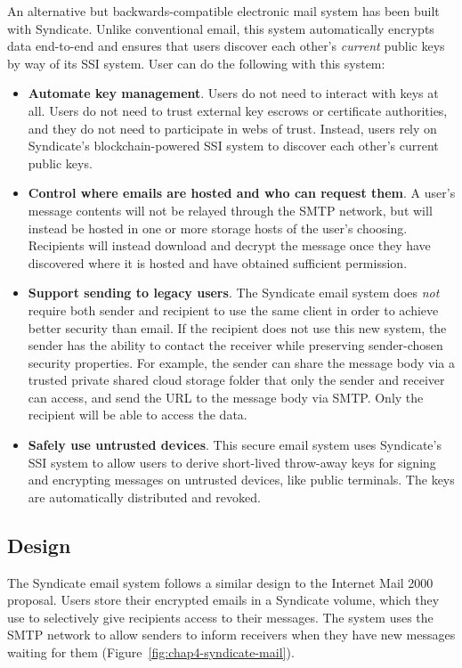 An alternative but backwards-compatible electronic mail system has been built
with Syndicate.  Unlike conventional email, this system
automatically encrypts data end-to-end and ensures that users
discover each other's \emph{current} public keys by way of its SSI
system.  User can do the following with this system:

\begin{itemize}
\item \textbf{Automate key management}.  Users do not need to interact with keys
at all.  Users do not need to trust external key escrows or certificate
authorities, and they do not need to participate in webs of trust.  Instead,
users rely on Syndicate's blockchain-powered SSI system to discover each other's
current public keys.

\item \textbf{Control where emails are hosted and who can request them}.
A user's message contents will
not be relayed through the SMTP network, but will instead be hosted in one or
more storage hosts of the user's choosing.  Recipients will instead download and
decrypt the message once they have discovered where it is hosted and have
obtained sufficient permission.

\item \textbf{Support sending to legacy users}.  The Syndicate email system does \emph{not}
require both sender and recipient to use the same client in order to achieve
better security than email.  If the recipient does not use this new system, the sender has
the ability to contact the receiver while
preserving sender-chosen security properties.  For example, 
the sender can share the message body via a trusted private shared cloud storage folder
that only the sender and receiver can access, and send the URL to the message
body via SMTP.  Only the recipient will be able to access the data.

\item \textbf{Safely use untrusted devices}.  This secure email system uses Syndicate's SSI system to
allow users to derive short-lived throw-away keys for signing and encrypting
messages on untrusted devices, like public terminals.  The keys are
automatically distributed and revoked.
\end{itemize}

\subsection{Design}

The Syndicate email system follows a similar design to the Internet Mail
2000~\cite{internet-mail-2000} proposal.  Users store their
encrypted emails in a Syndicate volume, which they
use to selectively give recipients access to their messages.  The system uses
the SMTP network to allow senders to inform receivers when they have new
messages waiting for them (Figure~\ref{fig:chap4-syndicate-mail}).

